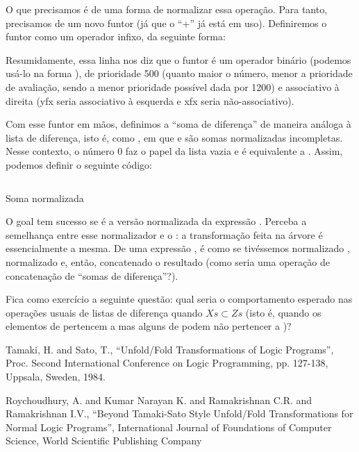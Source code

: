 \documentclass{article}
\begin{document}
O que precisamos é de uma forma de normalizar essa operação. Para
tanto, precisamos de um novo funtor (já que o ``+'' já está em
uso). Definiremos o funtor  como um operador infixo, da
seguinte forma:


\noindent Resumidamente, essa linha nos diz que o funtor 
é um operador binário (podemos usá-lo na forma ), de
prioridade 500 (quanto maior o número, menor a prioridade de
avaliação, sendo a menor prioridade possível dada por 1200) e
associativo à direita (yfx seria associativo à esquerda e xfx seria
não-associativo).

Com esse funtor em mãos, definimos a ``soma de diferença'' de maneira
análoga à lista de diferença, isto é, como , em que
 e  são somas normalizadas incompletas. Nesse
contexto, o número 0 faz o papel da lista vazia e  é
equivalente a . Assim, podemos definir o seguinte código:

    \begin{listing}
\inputminted{prolog}{../Exemplos/Cap3/progn_normalized_sum.pl}
\caption{Soma normalizada}\label{lst:norm}
    \end{listing}

\noindent O goal  tem sucesso se
 é a versão normalizada da expressão .  Perceba a
semelhança entre esse normalizador e o : a
transformação feita na árvore é essencialmente a mesma. De uma
expressão , é como se tivéssemos normalizado ,
normalizado  e, então, concatenado o resultado (como seria uma
operação de concatenação de ``somas de diferença''?).

Fica como exercício a seguinte questão: qual seria o comportamento
esperado nas operações usuais de listas de diferença
 quando $Xs \subset Zs$ (isto é, quando os
elementos de  pertencem a  mas alguns de 
podem não pertencer a )?

  \begin{thebibliography}{1}

     Tamaki, H. and Sato, T., ``Unfold/Fold
      Transformations of Logic Programs'', Proc. Second International
      Conference on Logic Programming, pp. 127-138, Uppsala, Sweden,
      1984.

     Roychoudhury, A. and Kumar Narayan K. and
      Ramakrishnan C.R. and Ramakrishnan I.V., ``Beyond Tamaki-Sato
      Style Unfold/Fold Transformations for Normal Logic Programs'',
      International Journal of Foundations of Computer Science, World
      Scientific Publishing Company

  \end{thebibliography}
\end{document}
